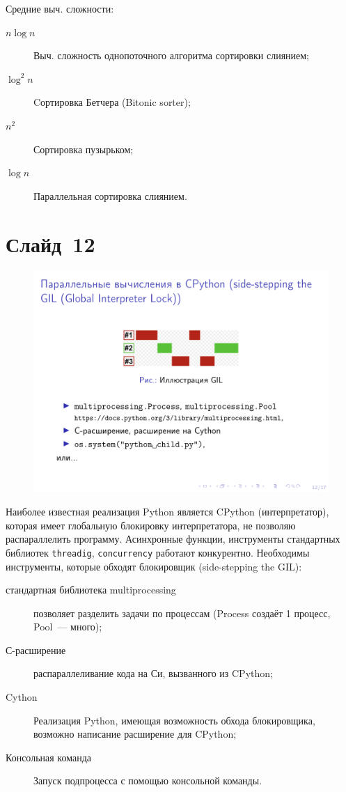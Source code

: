 \documentclass[aps,pre,reprint]{revtex4-2}
\begin{document}
	Средние выч. сложности:
	\begin{description}
		\item[$n\log n$] Выч. сложность однопоточного алгоритма сортировки слиянием;
		\item[$\log^2{}{n}$] Cортировка Бетчера (Bitonic sorter);
		\item[$n^2$] Сортировка пузырьком;
		\item[$\log n$] Параллельная сортировка слиянием.
	\end{description}

	\section{Слайд~12}
	\begin{figure}[H]
		\includegraphics[scale=.7]{presentation-12.png}
	\end{figure}
	
	Наиболее известная реализация Python является CPython (интерпретатор), которая имеет глобальную блокировку интерпретатора, не позволяю распараллелить программу. Асинхронные функции, инструменты стандартных библиотек \verb*|threadig|, \verb*|concurrency| работают конкурентно. Необходимы инструменты, которые обходят блокировщик (side-stepping the GIL):
	\begin{description}
		\item[стандартная библиотека multiprocessing] позволяет разделить задачи по процессам (Process создаёт 1 процесс, Pool~--- много);
		\item[С-расширение] распараллеливание кода на Си, вызванного из CPython;
		\item[Cython] Реализация Python, имеющая возможность обхода блокировщика, возможно написание расширение для CPython;
		\item[Консольная команда] Запуск подпроцесса с помощью консольной команды.
	\end{description}
\end{document}
